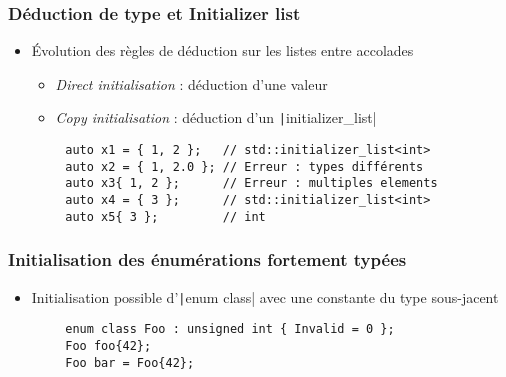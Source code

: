 \documentclass[C++.tex]{subfiles}
\begin{document}
\begin{frame}[fragile]
	\frametitle{Déduction de type et Initializer list}
	\begin{itemize}
		\item Évolution des règles de déduction sur les listes entre accolades
		\begin{itemize}
			\item \textit{Direct initialisation} : déduction d'une valeur


			\item \textit{Copy initialisation} : déduction d'un \texttt|initializer_list|

		\end{itemize}
	\end{itemize}

	\begin{verbatim}
		auto x1 = { 1, 2 };   // std::initializer_list<int>
		auto x2 = { 1, 2.0 }; // Erreur : types différents
		auto x3{ 1, 2 };      // Erreur : multiples elements
		auto x4 = { 3 };      // std::initializer_list<int>
		auto x5{ 3 };         // int
	\end{verbatim}

\end{frame}

\begin{frame}[fragile]
	\frametitle{Initialisation des énumérations fortement typées}
	\begin{itemize}
		\item Initialisation possible d'\texttt|enum class| avec une constante du type sous-jacent
	\end{itemize}

	\begin{verbatim}
		enum class Foo : unsigned int { Invalid = 0 };
		Foo foo{42};
		Foo bar = Foo{42};
	\end{verbatim}

\end{frame}
\end{document}
